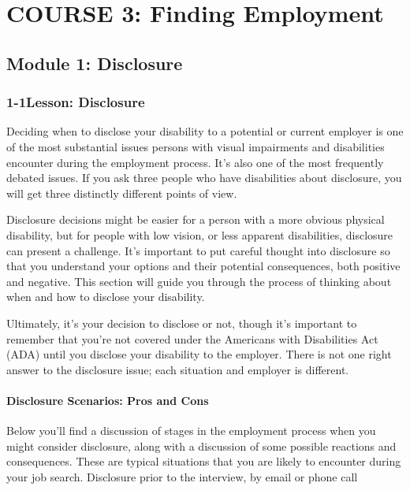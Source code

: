 \hypertarget{course3}{}\chapter*{COURSE 3: Finding Employment}\label{course3}
\noindent\makebox[\linewidth]{\rule{\linewidth}{0.4pt}}
\localtableofcontents
\noindent\makebox[\textwidth]{\rule{\linewidth}{0.4pt}}
\newpage

\pagebreak \section*{Module 1: Disclosure}
\noindent\makebox[\textwidth]{\rule{\linewidth}{0.4pt}} 
\localtableofcontents
\noindent\makebox[\textwidth]{\rule{\linewidth}{0.4pt}}
\leftskip=0.5cm

\pagebreak \subsection*{1-1\quad Lesson: Disclosure}
Deciding when to disclose your disability to a potential or current employer is one of the most substantial issues persons with visual impairments and disabilities encounter during the employment process. It's also one of the most frequently debated issues. If you ask three people who have disabilities about disclosure, you will get three distinctly different points of view.

Disclosure decisions might be easier for a person with a more obvious physical disability, but for people with low vision, or less apparent disabilities, disclosure can present a challenge. It's important to put careful thought into disclosure so that you understand your options and their potential consequences, both positive and negative. This section will guide you through the process of thinking about when and how to disclose your disability.

Ultimately, it's your decision to disclose or not, though it's important to remember that you're not covered under the Americans with Disabilities Act (ADA) until you disclose your disability to the employer. There is not one right answer to the disclosure issue; each situation and employer is different.

\subsubsection*{Disclosure Scenarios: Pros and Cons}
Below you'll find a discussion of stages in the employment process when you might consider disclosure, along with a discussion of some possible reactions and consequences. These are typical situations that you are likely to encounter during your job search.
Disclosure prior to the interview, by email or phone call

